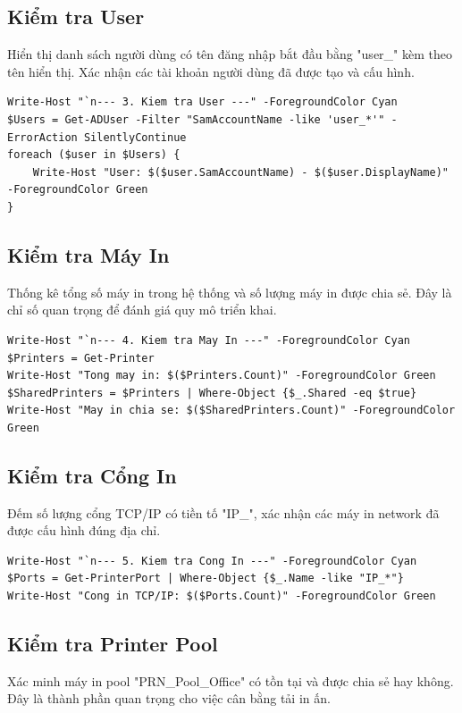 \subsection{Kiểm tra User}
Hiển thị danh sách người dùng có tên đăng nhập bắt đầu bằng "user\_" kèm theo tên hiển thị. Xác nhận các tài khoản người dùng đã được tạo và cấu hình.

\begin{lstlisting}[style=powershell]
Write-Host "`n--- 3. Kiem tra User ---" -ForegroundColor Cyan
$Users = Get-ADUser -Filter "SamAccountName -like 'user_*'" -ErrorAction SilentlyContinue
foreach ($user in $Users) {
    Write-Host "User: $($user.SamAccountName) - $($user.DisplayName)" -ForegroundColor Green
}
\end{lstlisting}

\subsection{Kiểm tra Máy In}
Thống kê tổng số máy in trong hệ thống và số lượng máy in được chia sẻ. Đây là chỉ số quan trọng để đánh giá quy mô triển khai.

\begin{lstlisting}[style=powershell]
Write-Host "`n--- 4. Kiem tra May In ---" -ForegroundColor Cyan
$Printers = Get-Printer
Write-Host "Tong may in: $($Printers.Count)" -ForegroundColor Green
$SharedPrinters = $Printers | Where-Object {$_.Shared -eq $true}
Write-Host "May in chia se: $($SharedPrinters.Count)" -ForegroundColor Green
\end{lstlisting}

\subsection{Kiểm tra Cổng In}
Đếm số lượng cổng TCP/IP có tiền tố "IP\_", xác nhận các máy in network đã được cấu hình đúng địa chỉ.

\begin{lstlisting}[style=powershell]
Write-Host "`n--- 5. Kiem tra Cong In ---" -ForegroundColor Cyan
$Ports = Get-PrinterPort | Where-Object {$_.Name -like "IP_*"}
Write-Host "Cong in TCP/IP: $($Ports.Count)" -ForegroundColor Green
\end{lstlisting}

\subsection{Kiểm tra Printer Pool}
Xác minh máy in pool "PRN\_Pool\_Office" có tồn tại và được chia sẻ hay không. Đây là thành phần quan trọng cho việc cân bằng tải in ấn.


